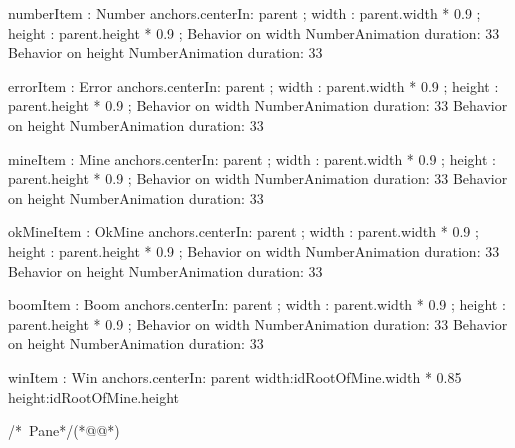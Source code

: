 \begin{thebookfilesourceone}[escapeinside={(*@}{@*)},
caption=GoodLuck,
title=\filesourcenumbernameone \thefilesourcenumber
]
{{        numberItem : Number{
            anchors.centerIn: parent ;
            width  : parent.width * 0.9 ;
            height : parent.height * 0.9 ;
            Behavior on width{
                NumberAnimation{
                    duration: 33
                }
            }
            Behavior on height{
                NumberAnimation{
                    duration: 33
                }
            }
        }

        errorItem : Error{
            anchors.centerIn: parent ;
            width  : parent.width * 0.9 ;
            height : parent.height * 0.9 ;
            Behavior on width{
                NumberAnimation{
                    duration: 33
                }
            }
            Behavior on height{
                NumberAnimation{
                    duration: 33
                }
            }
        }

        mineItem : Mine{
            anchors.centerIn: parent ;
            width  : parent.width * 0.9 ;
            height : parent.height * 0.9 ;
            Behavior on width{
                NumberAnimation{
                    duration: 33
                }
            }
            Behavior on height{
                NumberAnimation{
                    duration: 33
                }
            }
        }

        okMineItem : OkMine{
            anchors.centerIn: parent ;
            width  : parent.width * 0.9 ;
            height : parent.height * 0.9 ;
            Behavior on width{
                NumberAnimation{
                    duration: 33
                }
            }
            Behavior on height{
                NumberAnimation{
                    duration: 33
                }
            }
        }

        boomItem : Boom {
            anchors.centerIn: parent ;
            width  : parent.width * 0.9 ;
            height : parent.height * 0.9 ;
            Behavior on width{
                NumberAnimation{
                    duration: 33
                }
            }
            Behavior on height{
                NumberAnimation{
                    duration: 33
                }
            }
        }

        winItem : Win {
            anchors.centerIn: parent
            width:idRootOfMine.width * 0.85
            height:idRootOfMine.height
        }

    }

}/*~Pane*/(*@\marginpar[\hfill\setlength\fboxsep{2pt}\fbox{\footnotesize{\kaishu\parbox{1em}{\setlength{\baselineskip}{2pt}\filesourcenumbernameone}}\footnotesize{\thefilesourcenumber}}]{\setlength\fboxsep{2pt}\fbox{\footnotesize{\kaishu\parbox{1em}{\setlength{\baselineskip}{2pt}\filesourcenumbernameone}}\footnotesize{\thefilesourcenumber}}}@*)\end{thebookfilesourceone}          %
\addtocounter{lstlisting}{-1}   %


